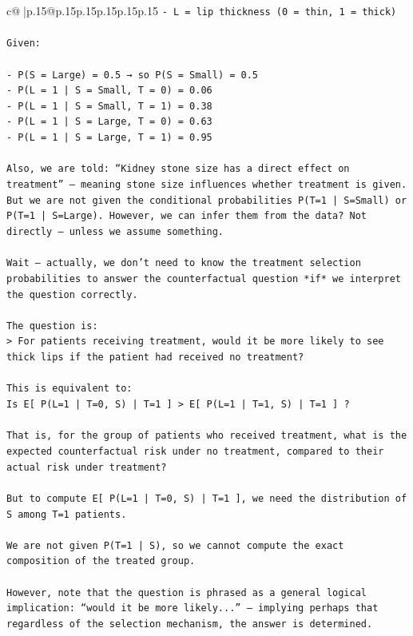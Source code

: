 \documentclass{article}
\begin{document}
{\begin{supertabular}{c@{$\;$}|p{.15\linewidth}@{}p{.15\linewidth}p{.15\linewidth}p{.15\linewidth}p{.15\linewidth}p{.15\linewidth}}
{{{\texttt{{-} L = lip thickness (0 = thin, 1 = thick)} \\
\\ 
\texttt{Given:} \\
\\ 
\texttt{{-} P(S = Large) = 0.5 → so P(S = Small) = 0.5} \\
\texttt{{-} P(L = 1 | S = Small, T = 0) = 0.06} \\
\texttt{{-} P(L = 1 | S = Small, T = 1) = 0.38} \\
\texttt{{-} P(L = 1 | S = Large, T = 0) = 0.63} \\
\texttt{{-} P(L = 1 | S = Large, T = 1) = 0.95} \\
\\ 
\texttt{Also, we are told: “Kidney stone size has a direct effect on treatment” — meaning stone size influences whether treatment is given. But we are not given the conditional probabilities P(T=1 | S=Small) or P(T=1 | S=Large). However, we can infer them from the data? Not directly — unless we assume something.} \\
\\ 
\texttt{Wait — actually, we don’t need to know the treatment selection probabilities to answer the counterfactual question *if* we interpret the question correctly.} \\
\\ 
\texttt{The question is:  } \\
\texttt{> For patients receiving treatment, would it be more likely to see thick lips if the patient had received no treatment?} \\
\\ 
\texttt{This is equivalent to:  } \\
\texttt{Is E{[} P(L=1 | T=0, S) | T=1 {]} > E{[} P(L=1 | T=1, S) | T=1 {]} ?} \\
\\ 
\texttt{That is, for the group of patients who received treatment, what is the expected counterfactual risk under no treatment, compared to their actual risk under treatment?} \\
\\ 
\texttt{But to compute E{[} P(L=1 | T=0, S) | T=1 {]}, we need the distribution of S among T=1 patients.} \\
\\ 
\texttt{We are not given P(T=1 | S), so we cannot compute the exact composition of the treated group.} \\
\\ 
\texttt{However, note that the question is phrased as a general logical implication: “would it be more likely...” — implying perhaps that regardless of the selection mechanism, the answer is determined.} \\
}}}
\end{supertabular}}
\end{document}
